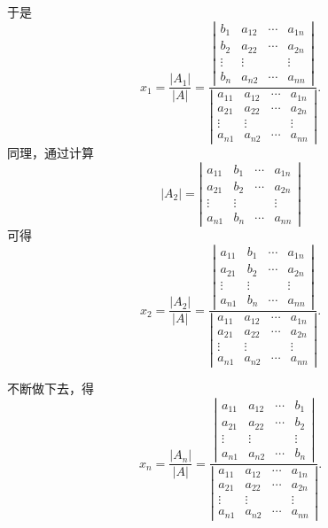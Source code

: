 \documentclass[UTF8,12pt,a4paper,fontset=fandol]{ctexart}
\begin{document}
于是
\[
x_1=\frac{|A_1|}{|A|}
=
\frac{
\left|\begin{array}{cccc}
b_1 & a_{12} & \cdots & a_{1n}\\
b_2 & a_{22} & \cdots & a_{2n}\\
\vdots & \vdots & & \vdots\\
b_n & a_{n2} & \cdots & a_{nn}
\end{array}\right|}
{\left|\begin{array}{cccc}
a_{11} & a_{12} & \cdots & a_{1n}\\
a_{21} & a_{22} & \cdots & a_{2n}\\
\vdots & \vdots & & \vdots\\
a_{n1} & a_{n2} & \cdots & a_{nn}
\end{array}\right|}.
\]
同理，通过计算
\[
|A_2|=
\left|\begin{array}{cccc}
a_{11} & b_1 & \cdots & a_{1n}\\
a_{21} & b_2 & \cdots & a_{2n}\\
\vdots & \vdots & & \vdots\\
a_{n1} & b_n & \cdots & a_{nn}
\end{array}\right|
\]
可得
\[
x_2=\frac{|A_2|}{|A|}
=
\frac{
\left|\begin{array}{cccc}
a_{11} & b_1 & \cdots & a_{1n}\\
a_{21} & b_2 & \cdots & a_{2n}\\
\vdots & \vdots & & \vdots\\
a_{n1} & b_n & \cdots & a_{nn}
\end{array}\right|}
{\left|\begin{array}{cccc}
a_{11} & a_{12} & \cdots & a_{1n}\\
a_{21} & a_{22} & \cdots & a_{2n}\\
\vdots & \vdots & & \vdots\\
a_{n1} & a_{n2} & \cdots & a_{nn}
\end{array}\right|}.
\]

不断做下去，得
\[
x_n=\frac{|A_n|}{|A|}
=
\frac{
\left|\begin{array}{cccc}
a_{11} & a_{12} & \cdots & b_1\\
a_{21} & a_{22} & \cdots & b_2\\
\vdots & \vdots & & \vdots\\
a_{n1} & a_{n2} & \cdots & b_n
\end{array}\right|}
{\left|\begin{array}{cccc}
a_{11} & a_{12} & \cdots & a_{1n}\\
a_{21} & a_{22} & \cdots & a_{2n}\\
\vdots & \vdots & & \vdots\\
a_{n1} & a_{n2} & \cdots & a_{nn}
\end{array}\right|}.
\]
\end{document}
